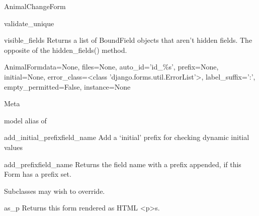 \documentclass[letterpaper,10pt,english]{sphinxmanual}
\begin{document}
\begin{classdesc}{AnimalChangeForm}
\hypertarget{animal.forms.AnimalChangeForm.validate_unique}{}\begin{methoddesc}[AnimalChangeForm]{validate\_unique}{}\end{methoddesc}

\hypertarget{animal.forms.AnimalChangeForm.visible_fields}{}\begin{methoddesc}[AnimalChangeForm]{visible\_fields}{}
Returns a list of BoundField objects that aren't hidden fields.
The opposite of the hidden\_fields() method.
\end{methoddesc}
\end{classdesc}

\hypertarget{animal.forms.AnimalForm}{}\begin{classdesc}{AnimalForm}{data=None, files=None, auto\_id='id\_\%s', prefix=None, initial=None, error\_class=\textless{}class 'django.forms.util.ErrorList'\textgreater{}, label\_suffix=':', empty\_permitted=False, instance=None}~

\hypertarget{animal.forms.AnimalForm.Meta}{}\begin{classdesc}{Meta}{}~

\hypertarget{animal.forms.AnimalForm.Meta.model}{}\begin{memberdesc}{model}
alias of 
\end{memberdesc}
\end{classdesc}

\hypertarget{animal.forms.AnimalForm.add_initial_prefix}{}\begin{methoddesc}[AnimalForm]{add\_initial\_prefix}{field\_name}
Add a `initial' prefix for checking dynamic initial values
\end{methoddesc}

\hypertarget{animal.forms.AnimalForm.add_prefix}{}\begin{methoddesc}[AnimalForm]{add\_prefix}{field\_name}
Returns the field name with a prefix appended, if this Form has a
prefix set.

Subclasses may wish to override.
\end{methoddesc}

\hypertarget{animal.forms.AnimalForm.as_p}{}\begin{methoddesc}[AnimalForm]{as\_p}{}
Returns this form rendered as HTML \textless{}p\textgreater{}s.
\end{methoddesc}


\end{classdesc}
\end{document}
